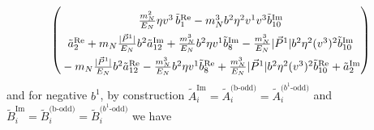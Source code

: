 \documentclass[]{article}
\numberwithin{equation}{section}
\newcommand{\bvec}{b}
\newcommand{\mN}{m_N}
\begin{document}
\begin{align}
\begin{pmatrix}
      \rule{0pt}{16pt} \frac{\mN^2}{E_N} \eta v^3\, \tilde b^{\text{Re}}_1 -\mN^3 \bvec^2 \eta^2 v^1 v^3\tilde b^{\text{Im}}_{10}\\
      \rule{0pt}{16pt}  \tilde a^{\text{Re}}_2 +  \mN  \frac{|\vec{P}^1|}{E_N} \bvec^2  \tilde a^{\text{Im}}_{12}+ \frac{  \mN^3}{E_N}  \bvec^2 \eta v^1  \tilde b^{\text{Im}}_8- \frac{ \mN^3}{E_N}  |\vec{P}^1| \bvec^2 \eta^2 (v^3)^2 \tilde b^{\text{Im}}_{10}\\
      \rule{0pt}{16pt} -  \mN  \frac{|\vec{P}^1|}{E_N} \bvec^2  \tilde a^{\text{Re}}_{12}- \frac{  \mN^3}{E_N}  \bvec^2 \eta v^1  \tilde b^{\text{Re}}_8+ \frac{ \mN^3}{E_N}  |\vec{P}^1| \bvec^2 \eta^2 (v^3)^2 \tilde b^{\text{Re}}_{10}+\tilde a^{\text{Im}}_2
    \end{pmatrix}
\end{align}
and for negative $b^1$, by construction $\tilde{A}^{\text{Im}}_i=\tilde{A}^{\text{(b-odd})}_i=\tilde{A}^{\text{($b^1$-odd})}_i$ and  $\tilde{B}^{\text{Im}}_i=\tilde{B}^{\text{(b-odd})}_i=\tilde{B}^{\text{($b^1$-odd})}_i$ we have 
\end{document}
